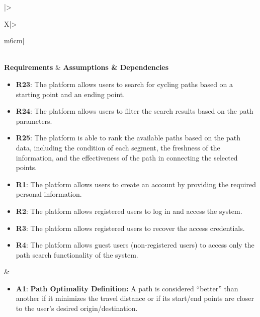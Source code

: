 \begin{table}[H]
    \centering
    \renewcommand{\arraystretch}{1.3}
    \begin{tabularx}{\textwidth}{|>{\raggedright\arraybackslash}X|>{\raggedright\arraybackslash}m{6cm}|}
        \hline
         \\ \hline
        \centering\textbf{Requirements} & \centering\textbf{Assumptions \& Dependencies} \tabularnewline \hline
        
        \begin{minipage}[t]{\linewidth}
        \begin{itemize}[leftmargin=*, nosep, label={}]
            \item \textbf{R23}: The platform allows users to search for cycling paths based on a starting point and an ending point.
            \item \textbf{R24}: The platform allows users to filter the search results based on the path parameters.
            \item \textbf{R25}: The platform is able to rank the available paths based on the path data, including the condition of each segment, the freshness of the information, and the effectiveness of the path in connecting the selected points.
            \item \textbf{R1}: The platform allows users to create an account by providing the required personal information.
            \item \textbf{R2}: The platform allows registered users to log in and access the system.
            \item \textbf{R3}: The platform allows registered users to recover the access credentials.
            \item \textbf{R4}: The platform allows guest users (non-registered users) to access only the path search functionality of the system.
        \end{itemize}
        \end{minipage}
        &
        \begin{minipage}[t]{\linewidth}
        \begin{itemize}[leftmargin=*, nosep, label={}]
            \item \textbf{A1}: \textbf{Path Optimality Definition:} A path is considered “better” than another if it minimizes the travel distance or if its start/end points are closer to the user’s desired origin/destination.

\end{itemize}
\end{minipage}
\end{tabularx}
\end{table}
